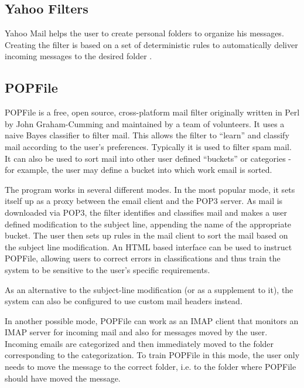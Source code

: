 \subsection{Yahoo Filters}
Yahoo Mail helps the user to create personal folders to organize his messages. 
Creating the filter is based on a set of deterministic rules to automatically deliver 
incoming messages to the desired folder \cite{YAHOO_FILTERS}.

\subsection{POPFile}
POPFile is a free, open source, cross-platform mail filter originally written in 
Perl by John Graham-Cumming and maintained by a team of volunteers. It uses a 
naive Bayes classifier to filter mail. This allows the filter to ``learn'' and 
classify mail according to the user's preferences. Typically it is used to filter 
spam mail. It can also be used to sort mail into other user defined ``buckets'' 
or categories - for example, the user may define a bucket into which work email 
is sorted.

The program works in several different modes. In the most popular mode, it sets 
itself up as a proxy between the email client and the POP3 server. As mail is 
downloaded via POP3, the filter identifies and classifies mail and makes a user 
defined modification to the subject line, appending the name of the appropriate 
bucket. The user then sets up rules in the mail client to sort the mail based 
on the subject line modification. An HTML based interface can be used to instruct 
POPFile, allowing users to correct errors in classifications and thus train the 
system to be sensitive to the user's specific requirements.

As an alternative to the subject-line modification (or as a supplement to it), 
the system can also be configured to use custom mail headers instead.

In another possible mode, POPFile can work as an IMAP client that monitors an 
IMAP server for incoming mail and also for messages moved by the user. Incoming 
emails are categorized and then immediately moved to the folder corresponding 
to the categorization. To train POPFile in this mode, the user only needs to 
move the message to the correct folder, i.e. to the folder where POPFile should 
have moved the message.

